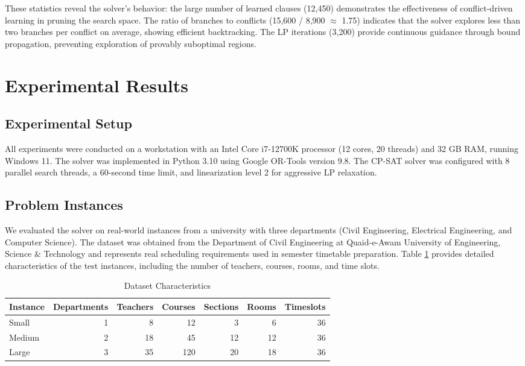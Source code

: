 \documentclass[12pt,a4paper]{article}
\begin{document}
These statistics reveal the solver's behavior: the large number of learned clauses (12,450) demonstrates the effectiveness of conflict-driven learning in pruning the search space. The ratio of branches to conflicts (15,600 / 8,900 $\approx$ 1.75) indicates that the solver explores less than two branches per conflict on average, showing efficient backtracking. The LP iterations (3,200) provide continuous guidance through bound propagation, preventing exploration of provably suboptimal regions.

\section{Experimental Results}

\subsection{Experimental Setup}

All experiments were conducted on a workstation with an Intel Core i7-12700K processor (12 cores, 20 threads) and 32 GB RAM, running Windows 11. The solver was implemented in Python 3.10 using Google OR-Tools version 9.8. The CP-SAT solver was configured with 8 parallel search threads, a 60-second time limit, and linearization level 2 for aggressive LP relaxation.

\subsection{Problem Instances}

We evaluated the solver on real-world instances from a university with three departments (Civil Engineering, Electrical Engineering, and Computer Science). The dataset was obtained from the Department of Civil Engineering at Quaid-e-Awam University of Engineering, Science \& Technology and represents real scheduling requirements used in semester timetable preparation. Table \ref{tab:dataset} provides detailed characteristics of the test instances, including the number of teachers, courses, rooms, and time slots.

\begin{table}[h]
\centering
\begin{tabular}{@{}lrrrrrr@{}}
\toprule
\textbf{Instance} & \textbf{Departments} & \textbf{Teachers} & \textbf{Courses} & \textbf{Sections} & \textbf{Rooms} & \textbf{Timeslots} \\ \midrule
Small & 1 & 8 & 12 & 3 & 6 & 36 \\
Medium & 2 & 18 & 45 & 12 & 12 & 36 \\
Large & 3 & 35 & 120 & 20 & 18 & 36 \\
\bottomrule
\end{tabular}
\caption{Dataset Characteristics}
\label{tab:dataset}
\end{table}
\end{document}
